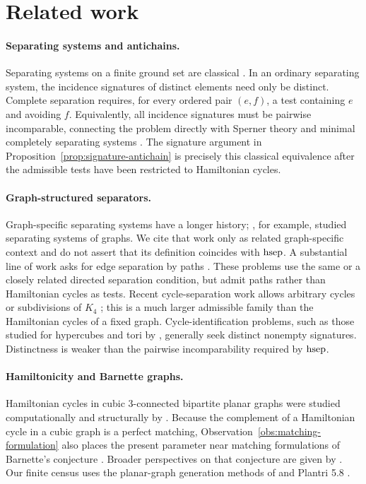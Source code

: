 \section{Related work}
\label{sec:related-work}

\paragraph{Separating systems and antichains.}
Separating systems on a finite ground set are classical
\citep{Katona1966,Dickson1969}.  In an ordinary separating system, the
incidence signatures of distinct elements need only be distinct.  Complete separation
requires, for every ordered pair \((e,f)\), a test containing \(e\) and
avoiding \(f\).  Equivalently, all incidence signatures must be pairwise
incomparable, connecting the problem directly with Sperner theory and minimal
completely separating systems \citep{Dickson1969,Spencer1970}.  The signature
argument in Proposition~\ref{prop:signature-antichain} is precisely this classical
equivalence after the admissible tests have been restricted to Hamiltonian
cycles.

\paragraph{Graph-structured separators.}
Graph-specific separating systems have a longer history; \citet{Cai1984}, for
example, studied separating systems of graphs.  We cite that work only as
related graph-specific context and do not assert that its definition coincides
with \(\operatorname{hsep}\).  A substantial line of work asks for edge separation by paths
\citep{FalgasRavryEtAl2014,BaloghEtAl2016,BonamyEtAl2023,Letzter2024}.
These problems use the same or a closely related directed separation
condition, but admit paths rather than Hamiltonian cycles as tests.  Recent
cycle-separation work allows arbitrary cycles or subdivisions of \(K_4\)
\citep{BotlerNaia2025}; this is a much larger admissible family than the
Hamiltonian cycles of a fixed graph.  Cycle-identification problems, such as
those studied for hypercubes and tori by \citet{HonkalaKarpovskyLitsyn2003},
generally seek distinct nonempty signatures.  Distinctness is weaker than the
pairwise incomparability required by \(\operatorname{hsep}\).

\paragraph{Hamiltonicity and Barnette graphs.}
Hamiltonian cycles in cubic 3-connected bipartite planar graphs were studied
computationally and structurally by \citet{HoltonManvelMcKay1985}.  Because the
complement of a Hamiltonian cycle in a cubic graph is a perfect matching,
Observation~\ref{obs:matching-formulation} also places the present parameter near matching
formulations of Barnette's conjecture \citep{GorskySteinerWiederrecht2023}.
Broader perspectives on that conjecture are given by \citet{AltEtAl2016}.
Our finite census uses the planar-graph generation methods of
\citet{BrinkmannMcKay2007} and Plantri 5.8 \citep{plantri58}.

